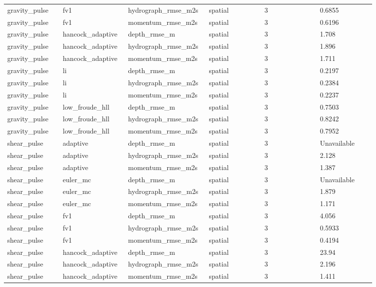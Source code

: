 \begin{longtable}{p{0.1467\linewidth}p{0.1467\linewidth}p{0.1467\linewidth}p{0.1467\linewidth}p{0.1467\linewidth}p{0.1467\linewidth}}
gravity\_pulse & fv1 & hydrograph\_rmse\_m2s & spatial & 3 & 0.6855 \\
gravity\_pulse & fv1 & momentum\_rmse\_m2s & spatial & 3 & 0.6196 \\
gravity\_pulse & hancock\_adaptive & depth\_rmse\_m & spatial & 3 & 1.708 \\
gravity\_pulse & hancock\_adaptive & hydrograph\_rmse\_m2s & spatial & 3 & 1.896 \\
gravity\_pulse & hancock\_adaptive & momentum\_rmse\_m2s & spatial & 3 & 1.711 \\
gravity\_pulse & li & depth\_rmse\_m & spatial & 3 & 0.2197 \\
gravity\_pulse & li & hydrograph\_rmse\_m2s & spatial & 3 & 0.2384 \\
gravity\_pulse & li & momentum\_rmse\_m2s & spatial & 3 & 0.2237 \\
gravity\_pulse & low\_froude\_hll & depth\_rmse\_m & spatial & 3 & 0.7503 \\
gravity\_pulse & low\_froude\_hll & hydrograph\_rmse\_m2s & spatial & 3 & 0.8242 \\
gravity\_pulse & low\_froude\_hll & momentum\_rmse\_m2s & spatial & 3 & 0.7952 \\
shear\_pulse & adaptive & depth\_rmse\_m & spatial & 3 & Unavailable \\
shear\_pulse & adaptive & hydrograph\_rmse\_m2s & spatial & 3 & 2.128 \\
shear\_pulse & adaptive & momentum\_rmse\_m2s & spatial & 3 & 1.387 \\
shear\_pulse & euler\_mc & depth\_rmse\_m & spatial & 3 & Unavailable \\
shear\_pulse & euler\_mc & hydrograph\_rmse\_m2s & spatial & 3 & 1.879 \\
shear\_pulse & euler\_mc & momentum\_rmse\_m2s & spatial & 3 & 1.171 \\
shear\_pulse & fv1 & depth\_rmse\_m & spatial & 3 & 4.056 \\
shear\_pulse & fv1 & hydrograph\_rmse\_m2s & spatial & 3 & 0.5933 \\
shear\_pulse & fv1 & momentum\_rmse\_m2s & spatial & 3 & 0.4194 \\
shear\_pulse & hancock\_adaptive & depth\_rmse\_m & spatial & 3 & 23.94 \\
shear\_pulse & hancock\_adaptive & hydrograph\_rmse\_m2s & spatial & 3 & 2.196 \\
shear\_pulse & hancock\_adaptive & momentum\_rmse\_m2s & spatial & 3 & 1.411 \\

\end{longtable}

